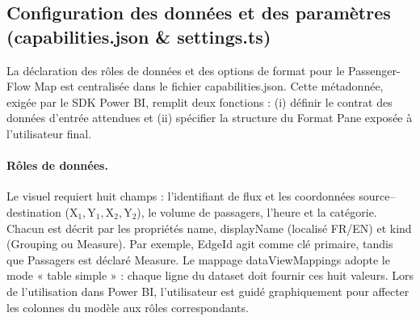 \subsection{Configuration des données et des paramètres (capabilities.json \& settings.ts)}
\label{subsec:4A-config}

\setlength{\parindent}{0pt}

La déclaration des rôles de données et des options de format pour le Passenger-Flow Map est centralisée dans le fichier capabilities.json. Cette métadonnée, exigée par le SDK Power BI, remplit deux fonctions : (i) définir le contrat des données d’entrée attendues et (ii) spécifier la structure du Format Pane exposée à l’utilisateur final.

\paragraph{Rôles de données.} Le visuel requiert huit champs : l’identifiant de flux et les coordonnées source–destination ($\text{X}_1,\text{Y}_1,\text{X}_2,\text{Y}_2$), le volume de passagers, l’heure et la catégorie. Chacun est décrit par les propriétés name, displayName (localisé FR/EN) et kind (Grouping ou Measure). Par exemple, EdgeId agit comme clé primaire, tandis que Passagers est déclaré Measure. Le mappage dataViewMappings adopte le mode « table simple » : chaque ligne du dataset doit fournir ces huit valeurs. Lors de l’utilisation dans Power BI, l’utilisateur est guidé graphiquement pour affecter les colonnes du modèle aux rôles correspondants.

